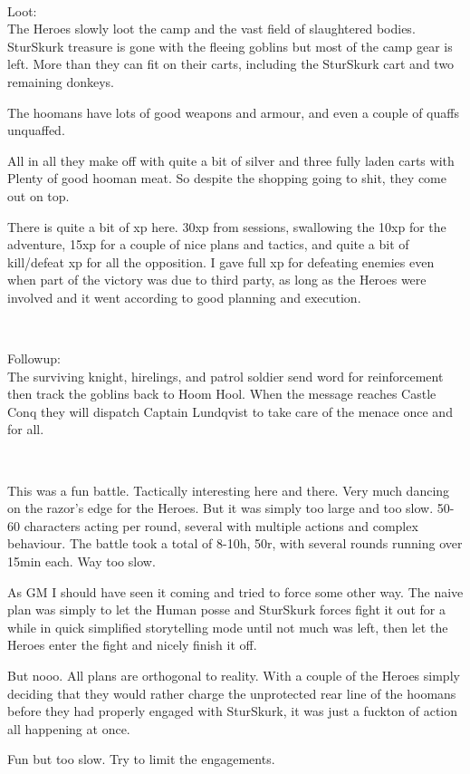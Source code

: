 \

Loot:\\
The Heroes slowly loot the camp and the vast field of slaughtered bodies. SturSkurk treasure is gone with the fleeing goblins but most of the camp gear is left. More than they can fit on their carts, including the SturSkurk cart and two remaining donkeys.

The hoomans have lots of good weapons and armour, and even a couple of quaffs unquaffed.

All in all they make off with quite a bit of silver and three fully laden carts with Plenty of good hooman meat. So despite the shopping going to shit, they come out on top.

There is quite a bit of xp here. 30xp from sessions, swallowing the 10xp for the adventure, 15xp for a couple of nice plans and tactics, and quite a bit of kill/defeat xp for all the opposition. I gave full xp for defeating enemies even when part of the victory was due to third party, as long as the Heroes were involved and it went according to good planning and execution.

\

Followup:\\
The surviving knight, hirelings, and patrol soldier send word for reinforcement then track the goblins back to Hoom Hool. When the message reaches Castle Conq they will dispatch Captain Lundqvist to take care of the menace once and for all.

\

\begin{readoutloud}
This was a fun battle. Tactically interesting here and there. Very much dancing on the razor's edge for the Heroes. But it was simply too large and too slow. 50-60 characters acting per round, several with multiple actions and complex behaviour. The battle took a total of 8-10h, 50r, with several rounds running over 15min each. Way too slow.

As GM I should have seen it coming and tried to force some other way. The naive plan was simply to let the Human posse and SturSkurk forces fight it out for a while in quick simplified storytelling mode until not much was left, then let the Heroes enter the fight and nicely finish it off.

But nooo. All plans are orthogonal to reality. With a couple of the Heroes simply deciding that they would rather charge the unprotected rear line of the hoomans before they had properly engaged with SturSkurk, it was just a fuckton of action all happening at once.

Fun but too slow. Try to limit the engagements. 
\end{readoutloud}



